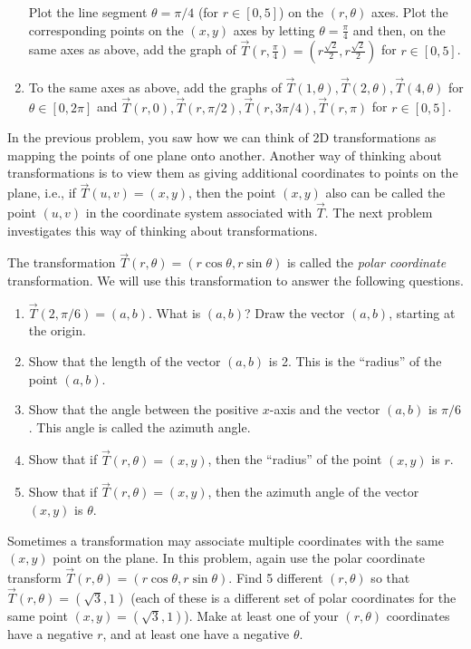 \begin{problem}
\begin{enumerate}
 Plot the line segment $\theta=\pi/4$ (for $r\in[0,5]$) on the $(r,\theta)$ axes.  Plot the corresponding points on the $(x,y)$ axes by letting $\theta=\frac{\pi}{4}$ and then, on the same axes as above, add the graph of 
$\vec T\left(r,\frac{\pi}{4}\right)=\left(r\frac{\sqrt 2}{2},r \frac{\sqrt 2}{2}\right)$ for $r\in[0,5]$.
\item{} To the same axes as above, add the graphs of 
$\vec T(1,\theta), \vec T(2,\theta), \vec T(4,\theta)$  for $\theta\in[0,2\pi]$ and 
$\vec T(r,0), \vec T(r,\pi/2), \vec T(r,3\pi/4), \vec T(r,\pi)$ for $r\in[0,5]$. 
\end{enumerate}
\end{problem}

In the previous problem, you saw how we can think of 2D transformations as mapping the points of one plane onto another.  Another way of thinking about transformations is to view them as giving additional coordinates to points on the plane, i.e., if $\vec T(u,v)=(x,y)$, then the point $(x,y)$ also can be called the point $(u,v)$ in the coordinate system associated with $\vec T$.  The next problem investigates this way of thinking about transformations.

\begin{problem}%
The transformation $\vec T(r,\theta) = (r\cos\theta,r\sin\theta)$ is called the \emph{polar coordinate} transformation.  We will use this transformation to answer the following questions.
\begin{enumerate}
\item $\vec T(2,\pi/6)=(a,b)$.  What is $(a,b)$?  Draw the vector $(a,b)$, starting at the origin.
\item Show that the length of the vector $(a,b)$ is 2.  This is the ``radius'' of the point $(a,b)$.
\item Show that the angle between the positive $x$-axis and the vector $(a,b)$ is $\pi/6$. This angle is called the azimuth angle.
\item Show that if $\vec T(r,\theta)=(x,y)$, then the ``radius'' of the point $(x,y)$ is $r$.
\item Show that if $\vec T(r,\theta)=(x,y)$, then the azimuth angle of the vector $(x,y)$ is $\theta$.
\end{enumerate}
\end{problem}


\begin{problem}
  Sometimes a transformation may associate multiple coordinates with the same $(x,y)$ point on the plane.  In this problem, again use the polar coordinate transform $\vec T(r,\theta) = (r\cos\theta,r\sin\theta)$.  Find 5 different $(r,\theta)$ so that $\vec T(r,\theta)=(\sqrt{3},1)$ (each of these is a different set of polar coordinates for the same point $(x,y)=(\sqrt{3},1)$).  Make at least one of your $(r,\theta)$ coordinates have a negative $r$, and at least one have a negative $\theta$.
\end{problem}

